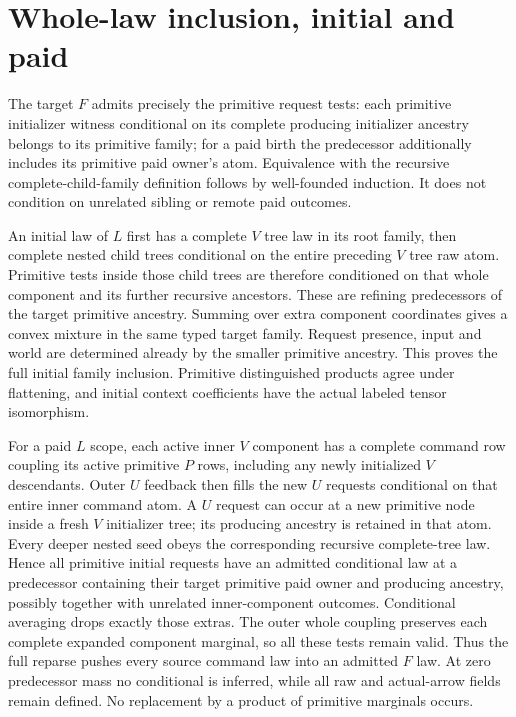 \documentclass[11pt]{article}\usepackage{amsmath,amssymb,amsthm,geometry}\geometry{margin=1in}\newtheorem{lemma}{Lemma}\newtheorem{theorem}[lemma]{Theorem}
\begin{document}
\section{Whole-law inclusion, initial and paid}
The target $F$ admits precisely the primitive request tests: each primitive initializer witness conditional on its complete producing initializer ancestry belongs to its primitive family; for a paid birth the predecessor additionally includes its primitive paid owner's atom. Equivalence with the recursive complete-child-family definition follows by well-founded induction. It does not condition on unrelated sibling or remote paid outcomes.

An initial law of $L$ first has a complete $V$ tree law in its root family, then complete nested child trees conditional on the entire preceding $V$ tree raw atom. Primitive tests inside those child trees are therefore conditioned on that whole component and its further recursive ancestors. These are refining predecessors of the target primitive ancestry. Summing over extra component coordinates gives a convex mixture in the same typed target family. Request presence, input and world are determined already by the smaller primitive ancestry. This proves the full initial family inclusion. Primitive distinguished products agree under flattening, and initial context coefficients have the actual labeled tensor isomorphism.

For a paid $L$ scope, each active inner $V$ component has a complete command row coupling its active primitive $P$ rows, including any newly initialized $V$ descendants. Outer $U$ feedback then fills the new $U$ requests conditional on that entire inner command atom. A $U$ request can occur at a new primitive node inside a fresh $V$ initializer tree; its producing ancestry is retained in that atom. Every deeper nested seed obeys the corresponding recursive complete-tree law. Hence all primitive initial requests have an admitted conditional law at a predecessor containing their target primitive paid owner and producing ancestry, possibly together with unrelated inner-component outcomes. Conditional averaging drops exactly those extras. The outer whole coupling preserves each complete expanded component marginal, so all these tests remain valid. Thus the full reparse pushes every source command law into an admitted $F$ law. At zero predecessor mass no conditional is inferred, while all raw and actual-arrow fields remain defined. No replacement by a product of primitive marginals occurs.
\end{document}
